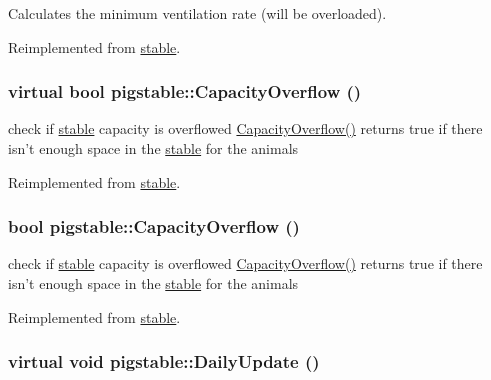 Calculates the minimum ventilation rate (will be overloaded). 

Reimplemented from \hyperlink{classstable_a9bd7855c10c562f9ea785d6ba3608dcc}{stable}.\hypertarget{classpigstable_a952f12bb06ab3080002183709010b0e9}{
\subsubsection[{CapacityOverflow}]{\setlength{\rightskip}{0pt plus 5cm}virtual bool pigstable::CapacityOverflow ()}}
\label{classpigstable_a952f12bb06ab3080002183709010b0e9}


check if \hyperlink{classstable}{stable} capacity is overflowed \hyperlink{classpigstable_ab741568ab92b4d23205c5c19c749b574}{CapacityOverflow()} returns true if there isn't enough space in the \hyperlink{classstable}{stable} for the animals 

Reimplemented from \hyperlink{classstable_a2014aabbb54c1309c936c527f3d385e8}{stable}.\hypertarget{classpigstable_ab741568ab92b4d23205c5c19c749b574}{
\subsubsection[{CapacityOverflow}]{\setlength{\rightskip}{0pt plus 5cm}bool pigstable::CapacityOverflow ()}}
\label{classpigstable_ab741568ab92b4d23205c5c19c749b574}


check if \hyperlink{classstable}{stable} capacity is overflowed \hyperlink{classpigstable_ab741568ab92b4d23205c5c19c749b574}{CapacityOverflow()} returns true if there isn't enough space in the \hyperlink{classstable}{stable} for the animals 

Reimplemented from \hyperlink{classstable_a2014aabbb54c1309c936c527f3d385e8}{stable}.\hypertarget{classpigstable_a0339646d96e17f62b6e745be279ec633}{
\subsubsection[{DailyUpdate}]{\setlength{\rightskip}{0pt plus 5cm}virtual void pigstable::DailyUpdate ()}}
\label{classpigstable_a0339646d96e17f62b6e745be279ec633}


